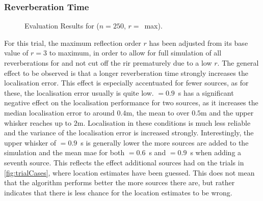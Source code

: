 \subsubsection*{Reverberation Time}
\begin{figure}[H]
\iftoggle{quick}{%
    \texttt{[image: plots/boxplots/boxplot-joined-T60]}
}{%
    
}%
	\caption[Evaluation Results for \Tsixty]{Evaluation Results for \Tsixty ($n=250$, $r=$~max).}
	\label{fig:trialT60}
\end{figure}

For this trial, the maximum reflection order $r$ has been adjusted from its base value of $r=3$ to maximum, in order to allow for full simulation of all reverberations for  and not cut off the \gls{rir} prematurely due to a low $r$. The general effect to be observed is that a longer reverberation time strongly increases the localisation error. This effect is especially accentuated for fewer sources, as for these, the localisation error usually is quite low. \Tsixty$=0.9$~s has a significant negative effect on the localisation performance for two sources, as it increases the median localisation error to around $0.4$m, the mean to over $0.5$m and the upper whisker reaches up to $2$m. Localisation in these conditions is much less reliable and the variance of the localisation error is increased strongly. Interestingly, the upper whisker of \Tsixty$=0.9$~s is generally lower the more sources are added to the simulation and the mean \gls{mae} for both \Tsixty$=0.6$~s and \Tsixty$=0.9$~s when adding a seventh source. This reflects the effect additional sources had on the trials in \autoref{fig:trialCases}, where location estimates have been guessed. This does not mean that the algorithm performs better the more sources there are, but rather indicates that there is less chance for the location estimates to be wrong.
